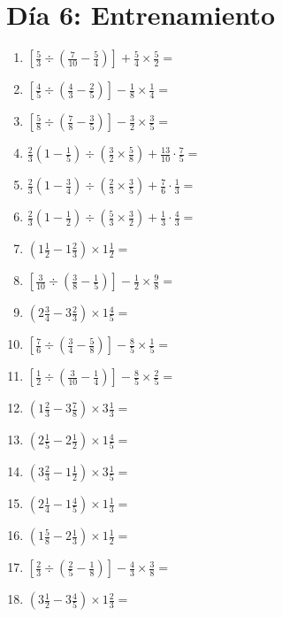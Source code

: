 \documentclass[12pt]{article}
\begin{document}
\section*{Día 6: Entrenamiento}
\begin{enumerate}[ itemsep=1.5cm]
	\item $\displaystyle \left[ \frac{5}{3} \div \left( \frac{7}{10} - \frac{5}{4} \right) \right] + \frac{5}{4} \times \frac{5}{2} =$
	\item $\displaystyle \left[ \frac{4}{5} \div \left( \frac{4}{3} - \frac{2}{5} \right) \right] - \frac{1}{8} \times \frac{1}{4} =$
	\item $\displaystyle \left[ \frac{5}{8} \div \left( \frac{7}{8} - \frac{3}{5} \right) \right] - \frac{3}{2} \times \frac{3}{5} =$
	\item $\displaystyle \frac{2}{3} \left( 1 - \frac{1}{5} \right) \div \left( \frac{3}{2} \times \frac{5}{8} \right) + \frac{13}{10} \cdot \frac{7}{5} =$
	\item $\displaystyle \frac{2}{3} \left( 1 - \frac{3}{4} \right) \div \left( \frac{2}{3} \times \frac{3}{5} \right) + \frac{7}{6} \cdot \frac{1}{3} =$
	\item $\displaystyle \frac{2}{3} \left( 1 - \frac{1}{2} \right) \div \left( \frac{5}{3} \times \frac{3}{2} \right) + \frac{1}{3} \cdot \frac{4}{3} =$
	\item $\displaystyle \left( 1 \frac{1}{2} - 1 \frac{2}{3} \right) \times 1 \frac{1}{2} =$
	\item $\displaystyle \left[ \frac{3}{10} \div \left( \frac{3}{8} - \frac{1}{5} \right) \right] - \frac{1}{2} \times \frac{9}{8} =$
	\item $\displaystyle \left( 2 \frac{3}{4} - 3 \frac{2}{3} \right) \times 1 \frac{4}{5} =$

	\item $\displaystyle \left[ \frac{7}{6} \div \left( \frac{3}{4} - \frac{5}{8} \right) \right] - \frac{8}{5} \times \frac{1}{5} =$
	\item $\displaystyle \left[ \frac{1}{2} \div \left( \frac{3}{10} - \frac{1}{4} \right) \right] - \frac{8}{5} \times \frac{2}{5} =$
	\item $\displaystyle \left( 1 \frac{2}{3} - 3 \frac{7}{8} \right) \times 3 \frac{1}{3} =$
	\item $\displaystyle \left( 2 \frac{1}{5} - 2 \frac{1}{2} \right) \times 1 \frac{4}{5} =$
	\item $\displaystyle \left( 3 \frac{2}{3} - 1 \frac{1}{2} \right) \times 3 \frac{1}{5} =$
	\item $\displaystyle \left( 2 \frac{1}{4} - 1 \frac{4}{5} \right) \times 1 \frac{1}{3} =$
	\item $\displaystyle \left( 1 \frac{5}{8} - 2 \frac{1}{3} \right) \times 1 \frac{1}{2} =$
	\item $\displaystyle \left[ \frac{2}{3} \div \left( \frac{2}{5} - \frac{1}{8} \right) \right] - \frac{4}{3} \times \frac{3}{8} =$
	\item $\displaystyle \left( 3 \frac{1}{2} - 3 \frac{4}{5} \right) \times 1 \frac{2}{3} =$


\end{enumerate}
\end{document}
